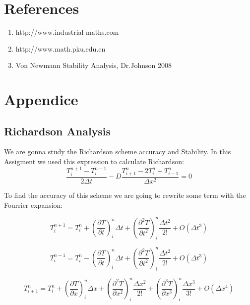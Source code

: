 \documentclass [10 pt, a4 paper]{article}
\begin{document}
\section{References}
\begin{enumerate}
    \item http://www.industrial-maths.com
    \item http://www.math.pku.edu.cn
    \item Von Newmann Stability Analysis, Dr.Johnson 2008
\end{enumerate}

\section{Appendice}
\subsection{Richardson Analysis}
We are gonna study the Richardson scheme accuracy and Stability. In this Assigment we used this expression
to calculate Richardson:
\begin{equation}
    \frac{T_{i}^{n+1} - T_{i}^{n-1}}{2\Delta t} - D \frac{T_{i+1}^{n} - 2 T_{i}^{n} + T_{i-1}^{n}}{\Delta x^{2}} = 0
\end{equation}

To find the accuracy of this scheme we are going to rewrite some term with the Fourrier expansion:

\begin{equation}
    T_{i}^{n+1} = T_{i}^{n} + (\frac{\partial T}{\partial t})_{i}^{n} \Delta t + (\frac{\partial^{2} T}{\partial t^{2}})_{i}^{n} \frac{\Delta t^{2}}{2!} + O(\Delta t^{3})
\end{equation}

\begin{equation}
    T_{i}^{n-1} = T_{i}^{n} - (\frac{\partial T}{\partial t})_{i}^{n} \Delta t + (\frac{\partial^{2} T}{\partial t^{2}})_{i}^{n} \frac{\Delta t^{2}}{2!} + O(\Delta t^{3})     
\end{equation}

\begin{equation}
    T_{i+1}^{n} = T_{i}^{n} + (\frac{\partial T}{\partial x})_{i}^{n} \Delta x + (\frac{\partial^{2} T}{\partial x^{2}})_{i}^{n} \frac{\Delta x^{2}}{2!} + (\frac{\partial^{3} T}{\partial x^{3}})_{i}^{n} \frac{\Delta x^{3}}{3!} + O(\Delta x^{4})     
\end{equation}
\end{document}
